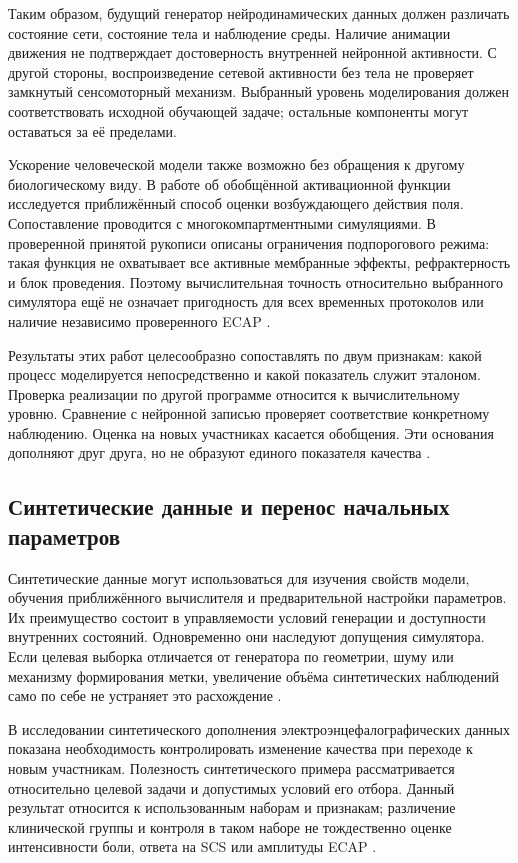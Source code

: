 Таким образом, будущий генератор нейродинамических данных должен различать состояние сети, состояние тела и наблюдение среды. Наличие анимации движения не подтверждает достоверность внутренней нейронной активности. С другой стороны, воспроизведение сетевой активности без тела не проверяет замкнутый сенсомоторный механизм. Выбранный уровень моделирования должен соответствовать исходной обучающей задаче; остальные компоненты могут оставаться за её пределами.

Ускорение человеческой модели также возможно без обращения к другому биологическому виду. В работе об обобщённой активационной функции исследуется приближённый способ оценки возбуждающего действия поля. Сопоставление проводится с многокомпартментными симуляциями. В проверенной принятой рукописи описаны ограничения подпорогового режима: такая функция не охватывает все активные мембранные эффекты, рефрактерность и блок проведения. Поэтому вычислительная точность относительно выбранного симулятора ещё не означает пригодность для всех временных протоколов или наличие независимо проверенного ECAP \cite{s877}.

Результаты этих работ целесообразно сопоставлять по двум признакам: какой процесс моделируется непосредственно и какой показатель служит эталоном. Проверка реализации по другой программе относится к вычислительному уровню. Сравнение с нейронной записью проверяет соответствие конкретному наблюдению. Оценка на новых участниках касается обобщения. Эти основания дополняют друг друга, но не образуют единого показателя качества \cite{s285,s743}.

\subsection{Синтетические данные и перенос начальных параметров}

Синтетические данные могут использоваться для изучения свойств модели, обучения приближённого вычислителя и предварительной настройки параметров. Их преимущество состоит в управляемости условий генерации и доступности внутренних состояний. Одновременно они наследуют допущения симулятора. Если целевая выборка отличается от генератора по геометрии, шуму или механизму формирования метки, увеличение объёма синтетических наблюдений само по себе не устраняет это расхождение \cite{s285,s836}.

В исследовании синтетического дополнения электроэнцефалографических данных показана необходимость контролировать изменение качества при переходе к новым участникам. Полезность синтетического примера рассматривается относительно целевой задачи и допустимых условий его отбора. Данный результат относится к использованным наборам и признакам; различение клинической группы и контроля в таком наборе не тождественно оценке интенсивности боли, ответа на SCS или амплитуды ECAP \cite{s836}.

